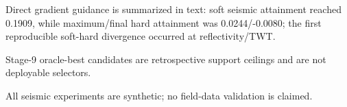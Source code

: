 \begin{table}[t]
\begin{threeparttable}
\begin{tablenotes}[flushleft]
\item[3] Direct gradient guidance is summarized in text: soft seismic attainment reached 0.1909, while maximum/final hard attainment was 0.0244/-0.0080; the first reproducible soft-hard divergence occurred at reflectivity/TWT.
\item[4] Stage-9 oracle-best candidates are retrospective support ceilings and are not deployable selectors.
\item[5] All seismic experiments are synthetic; no field-data validation is claimed.
\end{tablenotes}
\end{threeparttable}
\end{table}

